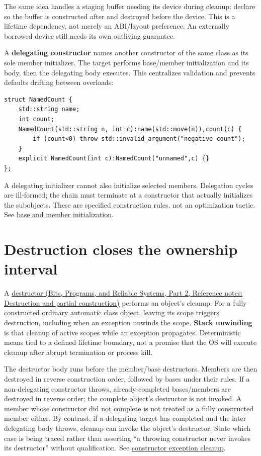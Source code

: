 The same idea handles a staging buffer needing its device during cleanup: declare  so the buffer is constructed after and destroyed before the device. This is a lifetime dependency, not merely an ABI/layout preference. An externally borrowed device still needs its own outliving guarantee.

A \textbf{delegating constructor} names another constructor of the same class as its sole member initializer. The target performs base/member initialization and its body, then the delegating body executes. This centralizes validation and prevents defaults drifting between overloads:

\begin{verbatim}
struct NamedCount {
    std::string name;
    int count;
    NamedCount(std::string n, int c):name(std::move(n)),count(c) {
        if (count<0) throw std::invalid_argument("negative count");
    }
    explicit NamedCount(int c):NamedCount("unnamed",c) {}
};
\end{verbatim}

A delegating initializer cannot also initialize selected members. Delegation cycles are ill-formed; the chain must terminate at a constructor that actually initializes the subobjects. These are specified construction rules, not an optimization tactic. See \href{https://eel.is/c++draft/class.base.init}{base and member initialization}.

\section{Destruction closes the ownership interval}\label{05-engine-i-ch003-destruction-closes-the-ownership-interval}

\hypertarget{05-engine-i-ch003-destruction-closes-the-ownership-interval}{}

A \href{../01-Bits-Programs-and-Reliable-Systems-P02/main.pdf\#nameddest=appendix-9bfe377cef7a}{destructor (Bits, Programs, and Reliable Systems, Part 2, Reference notes: Destruction and partial construction)} performs an object's cleanup. For a fully constructed ordinary automatic class object, leaving its scope triggers destruction, including when an exception unwinds the scope. \textbf{Stack unwinding} is that cleanup of active scopes while an exception propagates. Deterministic means tied to a defined lifetime boundary, not a promise that the OS will execute cleanup after abrupt termination or process kill.

The destructor body runs before the member/base destructors. Members are then destroyed in reverse construction order, followed by bases under their rules. If a non-delegating constructor throws, already-completed bases/members are destroyed in reverse order; the complete object's destructor is not invoked. A member whose constructor did not complete is not treated as a fully constructed member either. By contrast, if a delegating target has completed and the later delegating body throws, cleanup can invoke the object's destructor. State which case is being traced rather than asserting ``a throwing constructor never invokes its destructor'' without qualification. See \href{https://eel.is/c++draft/except.ctor}{constructor exception cleanup}.

